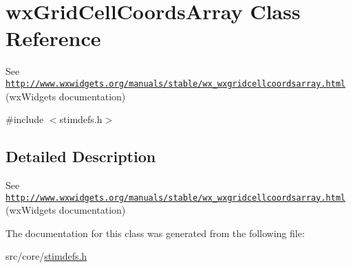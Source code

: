 \hypertarget{classwxGridCellCoordsArray}{
\section{wxGridCellCoordsArray Class Reference}
\label{classwxGridCellCoordsArray}
}


See \href{http://www.wxwidgets.org/manuals/stable/wx_wxgridcellcoordsarray.html}{\tt http://www.wxwidgets.org/manuals/stable/wx\_\-wxgridcellcoordsarray.html} (wxWidgets documentation)  




{\ttfamily \#include $<$stimdefs.h$>$}



\subsection{Detailed Description}
See \href{http://www.wxwidgets.org/manuals/stable/wx_wxgridcellcoordsarray.html}{\tt http://www.wxwidgets.org/manuals/stable/wx\_\-wxgridcellcoordsarray.html} (wxWidgets documentation) 

The documentation for this class was generated from the following file:\begin{DoxyCompactItemize}
\item 
src/core/\hyperlink{stimdefs_8h}{stimdefs.h}\end{DoxyCompactItemize}
